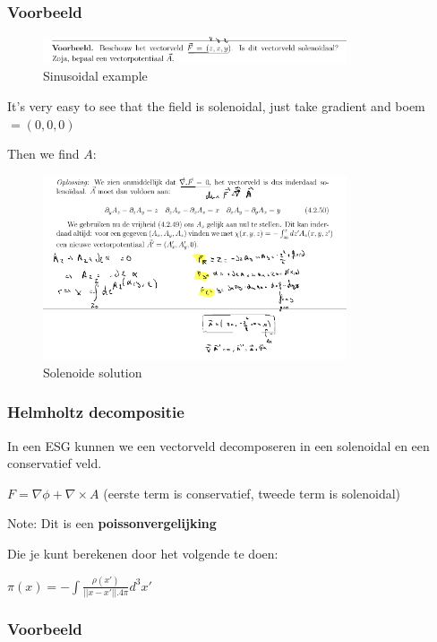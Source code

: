 \documentclass[a4paper]{report}
\begin{document}
\subsubsection{Voorbeeld}


\begin{figure}[H]
	\centering
	\includegraphics[width=0.8\textwidth]{assets/sinusoidal_example.png}
	\caption{Sinusoidal example}
	\label{fig:sinusoidal_example}
\end{figure}

It's very easy to see that the field is solenoidal, just take gradient and boem $= (0,0,0)$

Then we find $A$:


\begin{figure}[H]
	\centering
	\includegraphics[width=0.8\textwidth]{assets/solenoide_solution.png}
	\caption{Solenoide solution}
	\label{fig:solenoide_solution}
\end{figure}

\subsubsection{Helmholtz decompositie}

In een ESG kunnen we een vectorveld decomposeren in een solenoidal en een conservatief veld.

$F = \nabla \phi + \nabla \times A$ (eerste term is conservatief, tweede term is solenoidal)

Note: Dit is een \textbf{poissonvergelijking}

Die je kunt berekenen door het volgende te doen:

$\pi(x) = - \int \frac{\rho(x')}{||x - x'|| . 4\pi} d^3 x'$

\subsubsection{Voorbeeld}
\end{document}
